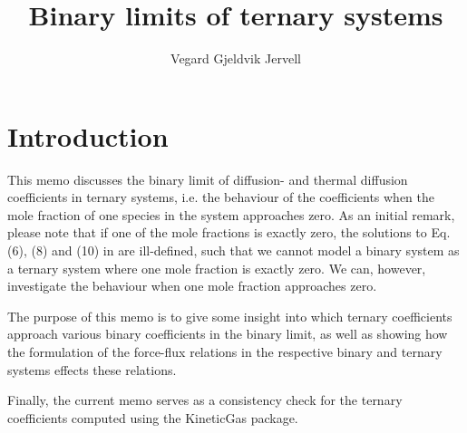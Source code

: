 \documentclass{article}
\title{Binary limits of ternary systems}
\author{Vegard Gjeldvik Jervell}
\begin{document}
\maketitle
\tableofcontents

\section{Introduction}

This memo discusses the binary limit of diffusion- and thermal diffusion coefficients in ternary systems, i.e. the behaviour of the coefficients when the mole fraction of one species in the system approaches zero. As an initial remark, please note that if one of the mole fractions is exactly zero, the solutions to Eq. (6), (8) and (10) in \cite{retmie} are ill-defined, such that we cannot model a binary system as a ternary system where one mole fraction is exactly zero. We can, however, investigate the behaviour when one mole fraction approaches zero.

The purpose of this memo is to give some insight into which ternary coefficients approach various binary coefficients in the binary limit, as well as showing how the formulation of the force-flux relations in the respective binary and ternary systems effects these relations.

Finally, the current memo serves as a consistency check for the ternary coefficients computed using the KineticGas package.


\clearpage



\clearpage



\end{document}
